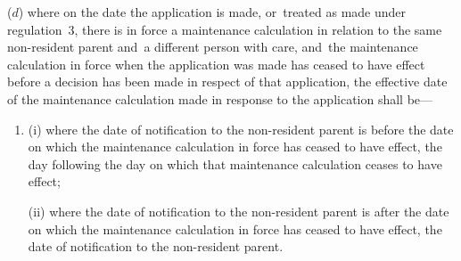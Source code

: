 \documentclass[12pt,a4paper]{article}
\begin{document}
\begin{enumerate}
($d$) 
where on the date the application is made, or~treated as made under regulation~3, there is in force a maintenance calculation in relation to the same non-resident parent and~a different person with care, and~the maintenance calculation in force when the application was made has ceased to have effect before a decision has been made in respect of that application, the effective date of the maintenance calculation made in response to the application shall be—
\begin{enumerate}\item[]
(i) where the date of notification to the non-resident parent is before the date on which the maintenance calculation in force has ceased to have effect, the day following the day on which that maintenance calculation ceases to have effect;

(ii) where the date of notification to the non-resident parent is after the date on which the maintenance calculation in force has ceased to have effect, the date of notification to the non-resident parent.
\end{enumerate}
\end{enumerate}

%
%
\end{document}
